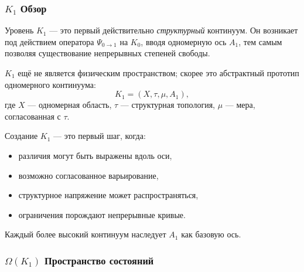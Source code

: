 

\subsubsection{\texorpdfstring{$K_1$}{K_1} Обзор}
\label{sec:k1-overview}

Уровень $K_1$ — это первый действительно
\emph{структурный} континуум.
Он возникает под действием оператора $\Psi_{0\to1}$ на $K_0$,
вводя одномерную ось $A_1$, тем самым позволяя существование
непрерывных степеней свободы.

$K_1$ ещё не является физическим пространством; скорее это абстрактный
прототип одномерного континуума:
\[
K_1 = (X, \tau, \mu, A_1),
\]
где $X$ — одномерная область, $\tau$ — структурная
топология, $\mu$ — мера, согласованная с $\tau$.

Создание $K_1$ — это первый шаг, когда:
\begin{itemize}
    \item различия могут быть выражены вдоль оси,
    \item возможно согласованное варьирование,
    \item структурное напряжение может распространяться,
    \item ограничения порождают непрерывные кривые.
\end{itemize}

Каждый более высокий континуум наследует $A_1$ как базовую ось.

\subsubsection{\texorpdfstring{$\Omega(K_1)$}{\Omega(K_1)} Пространство состояний}

